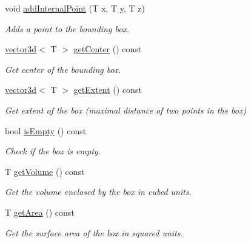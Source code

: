 \begin{DoxyCompactItemize}
void \hyperlink{classirr_1_1core_1_1aabbox3d_a123947cb6d77a3e0d6cbb65b63e8b86f}{add\+Internal\+Point} (T x, T y, T z)
\begin{DoxyCompactList}\small\item\em Adds a point to the bounding box. \end{DoxyCompactList}\item 
\hyperlink{classirr_1_1core_1_1vector3d}{vector3d}$<$ T $>$ \hyperlink{classirr_1_1core_1_1aabbox3d_ad2e956303fd85f900f93c067fd9c2647}{get\+Center} () const
\begin{DoxyCompactList}\small\item\em Get center of the bounding box. \end{DoxyCompactList}\item 
\hyperlink{classirr_1_1core_1_1vector3d}{vector3d}$<$ T $>$ \hyperlink{classirr_1_1core_1_1aabbox3d_a6a1e82ae4fdb3cf9fac19905b772e03e}{get\+Extent} () const
\begin{DoxyCompactList}\small\item\em Get extent of the box (maximal distance of two points in the box) \end{DoxyCompactList}\item 
bool \hyperlink{classirr_1_1core_1_1aabbox3d_a99f4afcfa29afd6e353b4377e4cbae84}{is\+Empty} () const
\begin{DoxyCompactList}\small\item\em Check if the box is empty. \end{DoxyCompactList}\item 
\mbox{\label{classirr_1_1core_1_1aabbox3d_a780f6f14562aa550ba7d90ac079f23ec}} 
T \hyperlink{classirr_1_1core_1_1aabbox3d_a780f6f14562aa550ba7d90ac079f23ec}{get\+Volume} () const
\begin{DoxyCompactList}\small\item\em Get the volume enclosed by the box in cubed units. \end{DoxyCompactList}\item 
\mbox{\label{classirr_1_1core_1_1aabbox3d_a8566c5c5c73b56ecd15e857a08ddc7dd}} 
T \hyperlink{classirr_1_1core_1_1aabbox3d_a8566c5c5c73b56ecd15e857a08ddc7dd}{get\+Area} () const
\begin{DoxyCompactList}\small\item\em Get the surface area of the box in squared units. \end{DoxyCompactList}\item 

\end{DoxyCompactItemize}
